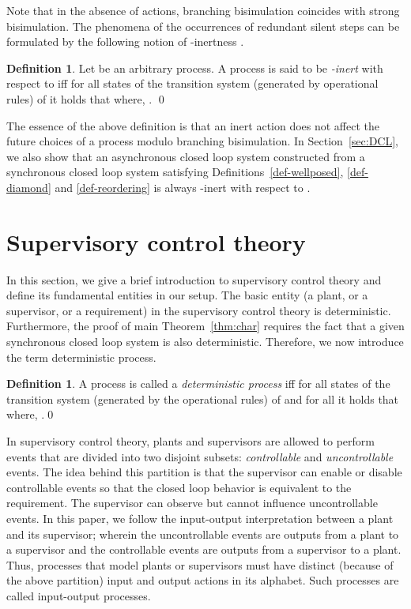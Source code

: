 \documentclass[copyright]{eptcs}
\theoremstyle{plain}
\theoremstyle{definition}
\newtheorem{definition}[theorem]{Definition}
\begin{document}
Note that in the absence of  actions, branching bisimulation coincides with strong bisimulation. The phenomena of the occurrences of redundant silent steps can be formulated by the following notion of -inertness \citep{confluence}.

\begin{definition}
Let  be an arbitrary process. A process  is said to be \emph{-inert} with respect to  iff for all states  of the transition system (generated by operational rules) of  it holds that  where, . \qed
\end{definition}

The essence of the above definition is that an inert  action does not affect the future choices of a process modulo branching bisimulation. In Section~\ref{sec:DCL}, we also show that an asynchronous closed loop system constructed from a synchronous closed loop system satisfying Definitions~\ref{def-wellposed}, \ref{def-diamond} and \ref{def-reordering} is always -inert with respect to .

\section{Supervisory control theory}\label{sec:introtorw}

In this section, we give a brief introduction to supervisory control theory and define its fundamental entities in our setup. The basic entity (a plant, or a supervisor, or a requirement) in the supervisory control theory is deterministic. Furthermore, the proof of main Theorem~\ref{thm:char} requires the fact that a given synchronous closed loop system is also deterministic. Therefore, we now introduce the term deterministic process.

\begin{definition}\label{def:determinism}
A process  is called a \emph{deterministic process} iff
for all states  of the transition system (generated by the operational rules) of  and for all  it holds that  where, .\qed
\end{definition}

In supervisory control theory, plants and supervisors are allowed to perform events that are divided into two disjoint subsets: \emph{controllable} and \emph{uncontrollable} events. The idea behind this partition is that the supervisor can enable or disable controllable events so that the closed loop behavior is equivalent to the requirement. The supervisor can observe but cannot influence uncontrollable events. In this paper, we follow the input-output interpretation \cite{balemiphdt} between a plant and its supervisor; wherein the uncontrollable events are outputs from a plant to a supervisor and the controllable events are outputs from a supervisor to a plant. Thus, processes that model plants or supervisors must have distinct (because of the above partition) input and output actions in its alphabet. Such processes are called input-output processes.
\end{document}
